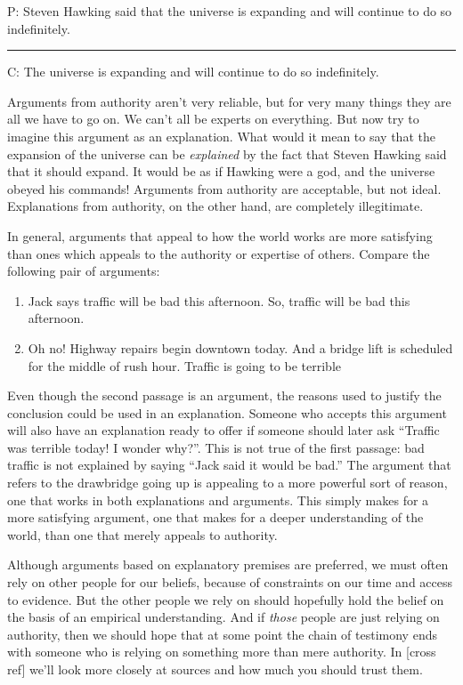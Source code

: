 { \begin{earg}
\item[P:] Steven Hawking said that the universe is expanding and will continue to do so indefinitely.
\vspace{-.5em}
\item [] \rule{\linewidth}{.5pt} 
\item[C:] The universe is expanding and will continue to do so indefinitely.
\end{earg} 

Arguments from authority aren't very reliable, but for very many things they are all we have to go on. We can't all be experts on everything. But now try to imagine this argument as an explanation. What would it mean to say that the expansion of the universe can be \textit{explained} by the fact that Steven Hawking said that it should expand. It would be as if Hawking were a god, and the universe obeyed his commands! Arguments from authority are acceptable, but not ideal. Explanations from authority, on the other hand, are completely illegitimate. \label{no_exp_from_authority}

In general, arguments that appeal to how the world works are more satisfying than ones which appeals to the authority or expertise of others. Compare the following pair of arguments:

\begin{enumerate}[label=(\alph*)]
\item Jack says traffic will be bad this afternoon. So, traffic will be bad this afternoon. 
\item Oh no! Highway repairs begin downtown today. And a bridge lift is scheduled for the middle of rush hour. Traffic is going to be terrible \end{enumerate}

Even though the second passage is an argument, the reasons used to justify the conclusion could be used in an explanation. Someone who accepts this argument will also have an explanation ready to offer if someone should later ask ``Traffic was terrible today! I wonder why?''. This is not true of the first passage: bad traffic is not explained by saying ``Jack said it would be bad.'' The argument that refers to the drawbridge going up is appealing to a more powerful sort of reason, one that works in both explanations and arguments. This simply makes for a more satisfying argument, one that makes for a deeper understanding of the world, than one that merely appeals to authority. 

Although arguments based on explanatory premises are preferred, we must often rely on other people for our beliefs, because of constraints on our time and access to evidence. But the other people we rely on should hopefully hold the belief on the basis of an empirical understanding. And if \textit{those} people are just relying on authority, then we should hope that at some point the chain of testimony ends with someone who is relying on something more than mere authority. In [cross ref] we'll look more closely at sources and how much you should trust them.

}
